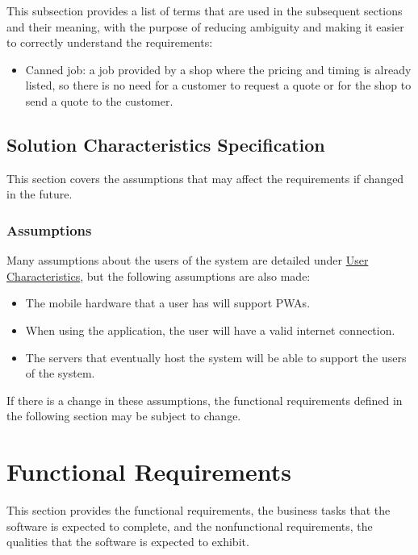 \documentclass[12pt]{article}
\begin{document}
This subsection provides a list of terms that are used in the subsequent
sections and their meaning, with the purpose of reducing ambiguity and making it
easier to correctly understand the requirements:

\begin{itemize}

\item \label{term_cannedJob} Canned job: a job provided by a shop where the pricing and timing is already listed, so there is no need for a customer to request a quote or for the shop to send a quote to the customer.

\end{itemize}

\subsection{Solution Characteristics Specification}

This section covers the assumptions that may affect the requirements if changed in the future.

\subsubsection{Assumptions}

Many assumptions about the users of the system are detailed under \hyperref[SecUserCharacteristics]{User Characteristics}, but the following assumptions are also made:

\begin{itemize}
    \item The mobile hardware that a user has will support PWAs.
    \item When using the application, the user will have a valid internet connection.
    \item The servers that eventually host the system will be able to support the users of the system.
\end{itemize}

\noindent If there is a change in these assumptions, the functional requirements defined in the following section may be subject to change.

\section{Functional Requirements} \label{sec:FuncReq}

This section provides the functional requirements, the business tasks that the
software is expected to complete, and the nonfunctional requirements, the
qualities that the software is expected to exhibit.
\end{document}
